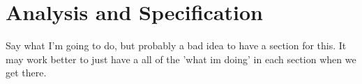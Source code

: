 \section{Analysis and Specification}
Say what I'm going to do, but probably a bad idea to have a section for this. It may work better to just have a all of the 'what im doing' in each section when we get there.
